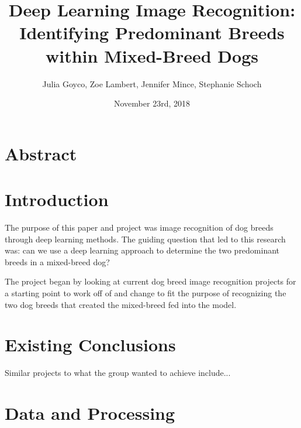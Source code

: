 \documentclass[12pt]{report}
\title{Deep Learning Image Recognition: 
	Identifying Predominant Breeds within Mixed-Breed Dogs}
\date{November 23rd, 2018}
\author{Julia Goyco, Zoe Lambert, Jennifer Mince, Stephanie Schoch}
\begin{document}
	\maketitle
\section*{Abstract} 
\indent	\par 
		\par 
\newpage
 \section* {Introduction} 
		
\indent	\par The purpose of this paper and project was image recognition of dog breeds through deep learning methods. The guiding question that led to this research was: can we use a deep learning approach to determine the two predominant breeds in a mixed-breed dog? 
\par The project began by looking at current dog breed image recognition projects for a starting point to work off of and change to fit the purpose of recognizing the two dog breeds that created the mixed-breed fed into the model.
	
\section* {Existing Conclusions} 
		
\indent	\par Similar projects to what the group wanted to achieve include...

\par 
		
\section* {Data and Processing} 
\end{document}
